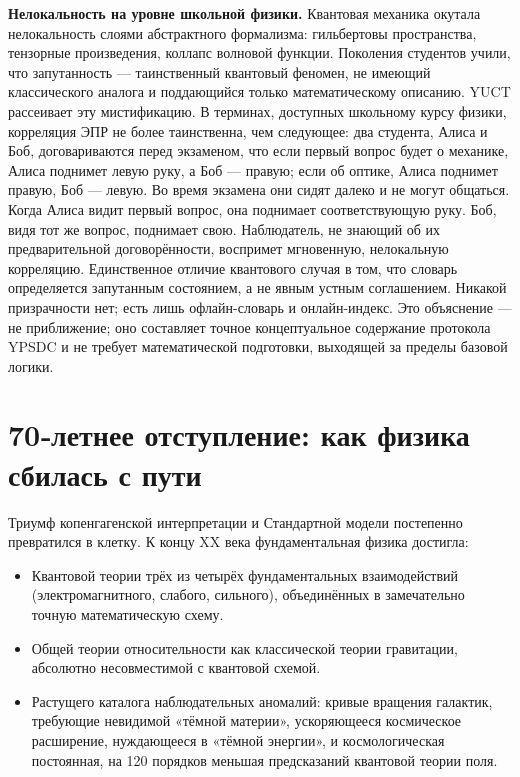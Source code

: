 \documentclass[12pt,a4paper]{article}
\begin{document}
	\textbf{Нелокальность на уровне школьной физики.} Квантовая механика окутала нелокальность слоями абстрактного формализма: гильбертовы пространства, тензорные произведения, коллапс волновой функции. Поколения студентов учили, что запутанность — таинственный квантовый феномен, не имеющий классического аналога и поддающийся только математическому описанию. YUCT рассеивает эту мистификацию. В терминах, доступных школьному курсу физики, корреляция ЭПР не более таинственна, чем следующее: два студента, Алиса и Боб, договариваются перед экзаменом, что если первый вопрос будет о механике, Алиса поднимет левую руку, а Боб — правую; если об оптике, Алиса поднимет правую, Боб — левую. Во время экзамена они сидят далеко и не могут общаться. Когда Алиса видит первый вопрос, она поднимает соответствующую руку. Боб, видя тот же вопрос, поднимает свою. Наблюдатель, не знающий об их предварительной договорённости, воспримет мгновенную, нелокальную корреляцию. Единственное отличие квантового случая в том, что словарь определяется запутанным состоянием, а не явным устным соглашением. Никакой призрачности нет; есть лишь офлайн-словарь и онлайн-индекс. Это объяснение — не приближение; оно составляет точное концептуальное содержание протокола YPSDC и не требует математической подготовки, выходящей за пределы базовой логики.
	
	\section{70‑летнее отступление: как физика сбилась с пути}
	
	Триумф копенгагенской интерпретации и Стандартной модели постепенно превратился в клетку. К концу XX века фундаментальная физика достигла:
	\begin{itemize}
		\item Квантовой теории трёх из четырёх фундаментальных взаимодействий (электромагнитного, слабого, сильного), объединённых в замечательно точную математическую схему.
		\item Общей теории относительности как классической теории гравитации, абсолютно несовместимой с квантовой схемой.
		\item Растущего каталога наблюдательных аномалий: кривые вращения галактик, требующие невидимой «тёмной материи», ускоряющееся космическое расширение, нуждающееся в «тёмной энергии», и космологическая постоянная, на 120 порядков меньшая предсказаний квантовой теории поля.
	\end{itemize}
	
\end{document}
